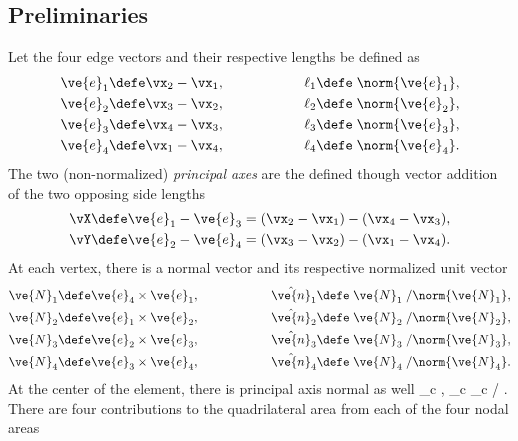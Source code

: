 \documentclass[14pt,letterpaper,fleqn]{extreport}
\begin{document}
\subsection{Preliminaries}

Let the four edge vectors and their respective lengths be defined as
\begin{align}
 \ve{e}_1 & \defe \vx_2 - \vx_1, \hspace{2cm} \ell_1 \defe \; \norm{\ve{e}_1}, \\
 \ve{e}_2 & \defe \vx_3 - \vx_2, \hspace{2cm} \ell_2 \defe \; \norm{\ve{e}_2}, \\
 \ve{e}_3 & \defe \vx_4 - \vx_3, \hspace{2cm} \ell_3 \defe \; \norm{\ve{e}_3}, \\
 \ve{e}_4 & \defe \vx_1 - \vx_4, \hspace{2cm} \ell_4 \defe \; \norm{\ve{e}_4}.
\end{align}
%
The two (non-normalized) {\em principal axes} are the defined though vector addition
of the two opposing side lengths
\begin{align}
 \vX & \defe \ve{e}_1 - \ve{e}_3 = (\vx_2 - \vx_1) - (\vx_4 - \vx_3), \\
 \vY & \defe \ve{e}_2 - \ve{e}_4 = (\vx_3 - \vx_2) - (\vx_1 - \vx_4).
\end{align}
%
At each vertex, there is a normal vector and its respective normalized unit vector
\begin{align}
 \ve{N}_1 & \defe \ve{e}_4 \times \ve{e}_1, \hspace{2cm} \hat{\ve{n}}_1 \defe \; \ve{N}_1 \; / \norm{\ve{N}_1}, \\
 \ve{N}_2 & \defe \ve{e}_1 \times \ve{e}_2, \hspace{2cm} \hat{\ve{n}}_2 \defe \; \ve{N}_2 \; / \norm{\ve{N}_2}, \\
 \ve{N}_3 & \defe \ve{e}_2 \times \ve{e}_3, \hspace{2cm} \hat{\ve{n}}_3 \defe \; \ve{N}_3 \; / \norm{\ve{N}_3}, \\
 \ve{N}_4 & \defe \ve{e}_3 \times \ve{e}_4, \hspace{2cm} \hat{\ve{n}}_4 \defe \; \ve{N}_4 \; / \norm{\ve{N}_4}.
\end{align}
%
At the center of the element, there is principal axis normal as well
\be
 _c   \vX \times \vY, \hspace{2cm} _c  \; _c \; / .
\ee
There are four contributions to the quadrilateral area from each of the four nodal areas
\end{document}
